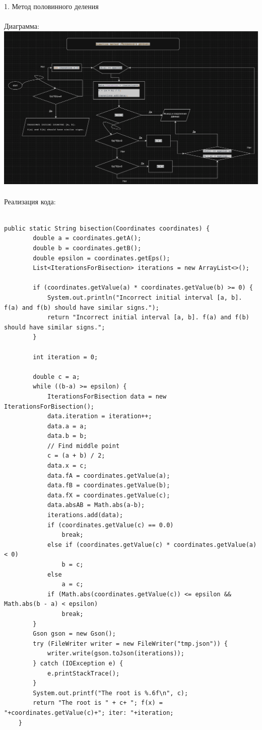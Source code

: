 \documentclass{article}
\begin{document}
1. Метод половинного деления
\\ \\
Диаграмма:\\
\includegraphics[width=.7\textwidth]{bisection.png}
\\ \\
Реализация кода:
\\ \\
\begin{lstlisting}[frame=single, basicstyle=\ttfamily, breaklines=true, breakatwhitespace=true, postbreak=\mbox{\textcolor{red}{$\hookrightarrow$}\space}]
    public static String bisection(Coordinates coordinates) {
        double a = coordinates.getA();
        double b = coordinates.getB();
        double epsilon = coordinates.getEps();
        List<IterationsForBisection> iterations = new ArrayList<>();

        if (coordinates.getValue(a) * coordinates.getValue(b) >= 0) {
            System.out.println("Incorrect initial interval [a, b]. f(a) and f(b) should have similar signs.");
            return "Incorrect initial interval [a, b]. f(a) and f(b) should have similar signs.";
        }

        int iteration = 0;

        double c = a;
        while ((b-a) >= epsilon) {
            IterationsForBisection data = new IterationsForBisection();
            data.iteration = iteration++;
            data.a = a;
            data.b = b;
            // Find middle point
            c = (a + b) / 2;
            data.x = c;
            data.fA = coordinates.getValue(a);
            data.fB = coordinates.getValue(b);
            data.fX = coordinates.getValue(c);
            data.absAB = Math.abs(a-b);
            iterations.add(data);
            if (coordinates.getValue(c) == 0.0)
                break;
            else if (coordinates.getValue(c) * coordinates.getValue(a) < 0)
                b = c;
            else
                a = c;
            if (Math.abs(coordinates.getValue(c)) <= epsilon && Math.abs(b - a) < epsilon)
                break;
        }
        Gson gson = new Gson();
        try (FileWriter writer = new FileWriter("tmp.json")) {
            writer.write(gson.toJson(iterations));
        } catch (IOException e) {
            e.printStackTrace();
        }
        System.out.printf("The root is %.6f\n", c);
        return "The root is " + c+ "; f(x) = "+coordinates.getValue(c)+"; iter: "+iteration;
    }
\end{lstlisting}
\end{document}
